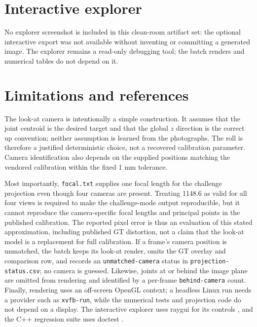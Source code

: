 \documentclass[11pt]{article}
\begin{document}


\appendix
\section{Interactive explorer}
No explorer screenshot is included in this clean-room artifact set: the
optional interactive export was not available without inventing or committing
a generated image.  The explorer remains a read-only debugging tool; the
batch renders and numerical tables do not depend on it.

\section{Limitations and references}
The look-at camera is intentionally a simple construction.  It assumes that
the joint centroid is the desired target and that the global $z$ direction is
the correct up convention; neither assumption is learned from the photographs.
The roll is therefore a justified deterministic choice, not a recovered
calibration parameter.  Camera identification also depends on the supplied
positions matching the vendored calibration within the fixed 1 mm tolerance.

Most importantly, \texttt{focal.txt} supplies one focal length for the
challenge projection even though four cameras are present.  Treating 1148.6 as
valid for all four views is required to make the challenge-mode output
reproducible, but it cannot reproduce the camera-specific focal lengths and
principal points in the published calibration.  The reported pixel error is
thus an evaluation of this stated approximation, including published GT
distortion, not a claim that the look-at model is a replacement for full
calibration.  If a frame's camera position is unmatched, the batch keeps its
look-at render, omits the GT overlay and comparison row, and records an
\texttt{unmatched-camera} status in \texttt{projection-status.csv}; no camera
is guessed.  Likewise, joints at or behind the image plane are omitted from
rendering and identified by a per-frame \texttt{behind-camera} count.  Finally,
rendering uses an off-screen OpenGL context; a headless Linux run needs a
provider such as \texttt{xvfb-run}, while the numerical tests and projection
code do not depend on a display.  The interactive explorer uses raygui for its
controls \cite{raygui}, and the C++ regression suite uses doctest \cite{doctest}.
\end{document}
